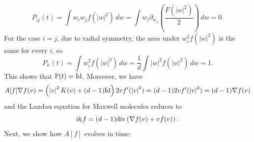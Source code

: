 \documentclass[11pt]{amsart}
\numberwithin{equation}{section}
\begin{document}
\begin{equation*}
  P_{ij}(t)=\int w_{i}w_{j}f(\left\vert w \right\vert ^{2})\,dw=\int w_{i}\partial_{w_{j}}\left(\frac{F(\left\vert w \right\vert ^{2})}{2}\right)\,dw=0.
\end{equation*}
For the case $i=j$, due to radial symmetry, the area under $w_{i}^{2}f(\left\vert w \right\vert ^{2})$ is the same for every $i$, so 
\begin{equation*}
  P_{ii}(t)=\int w_{i}^{2}f(\left\vert w \right\vert ^{2})\,dw=\frac{1}{d}\int\left\vert w \right\vert ^{2}f(\left\vert w \right\vert ^{2})\,dw=1.
\end{equation*}
This shows that $\mathbb{P}(t)=\textnormal{Id}$. Moreover, we have 
\begin{equation*}
  A[f]\nabla f(v)  =\left(\left\vert v \right\vert ^{2}K(v)+(d-1)\textnormal{Id}\right)2vf'(\left\vert v \right\vert ^{2})
  =(d-1)2vf'(\left\vert v \right\vert ^{2})=(d-1)\nabla f(v)
\end{equation*}
and the Landau equation for Maxwell molecules reduces to
\begin{equation*}
  \partial_{t}f=(d-1)\textnormal{div}\left(\nabla f(v)+vf(v)\right).
\end{equation*}
Next, we show how $A[f]$ evolves in time:
\end{document}
